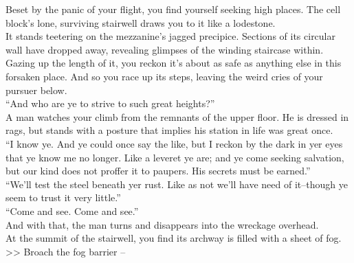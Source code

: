 Beset by the panic of your flight, you find yourself seeking high places. The cell block’s lone, surviving stairwell draws you to it like a lodestone.\\

It stands teetering on the mezzanine’s jagged precipice. Sections of its circular wall have dropped away, revealing glimpses of the winding staircase within. Gazing up the length of it, you reckon it’s about as safe as anything else in this forsaken place. And so you race up its steps, leaving the weird cries of your pursuer below.\\

“And who are ye to strive to such great heights?”\\

A man watches your climb from the remnants of the upper floor. He is dressed in rags, but stands with a posture that implies his station in life was great once.\\

“I know ye. And ye could once say the like, but I reckon by the dark in yer eyes that ye know me no longer. Like a leveret ye are; and ye come seeking salvation, but our kind does not proffer it to paupers. His secrets must be earned.”\\

“We’ll test the steel beneath yer rust. Like as not we’ll have need of it--though ye seem to trust it very little.”\\

“Come and see. Come and see.”\\

And with that, the man turns and disappears into the wreckage overhead.\\

At the summit of the stairwell, you find its archway is filled with a sheet of fog.\\

>> Broach the fog barrier -- \\